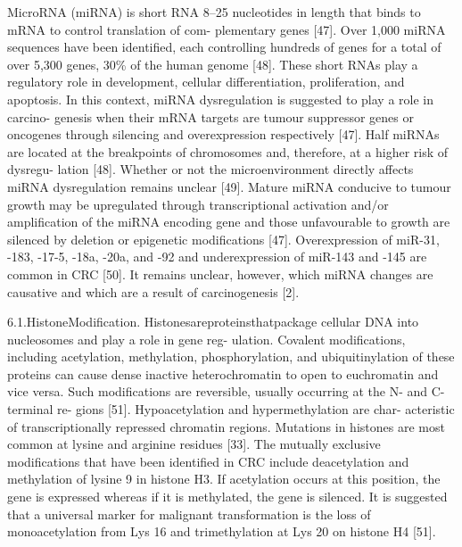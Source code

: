   MicroRNA (miRNA) is short RNA 8–25 nucleotides in length that binds to mRNA to
    control translation of com- plementary genes [47]. Over 1,000 miRNA sequences
    have been identified, each controlling hundreds of genes for a total of over
    5,300 genes, 30\% of the human genome [48]. These short RNAs play a regulatory
    role in development, cellular differentiation, proliferation, and apoptosis. In
    this context, miRNA dysregulation is suggested to play a role in carcino-
    genesis when their mRNA targets are tumour suppressor genes or oncogenes through
    silencing and overexpression respectively [47]. Half miRNAs are located at the
    breakpoints of chromosomes and, therefore, at a higher risk of dysregu- lation
    [48]. Whether or not the microenvironment directly affects miRNA dysregulation
    remains unclear [49]. Mature miRNA conducive to tumour growth may be upregulated
    through transcriptional activation and/or amplification of the miRNA encoding
    gene and those unfavourable to growth are silenced by deletion or epigenetic
    modifications [47]. Overexpression of miR-31, -183, -17-5, -18a, -20a, and -92
    and underexpression of miR-143 and -145 are common in CRC [50]. It remains
    unclear, however, which miRNA changes are causative and which are a result of
    carcinogenesis [2].

  6.1.HistoneModification. Histonesareproteinsthatpackage cellular DNA into
    nucleosomes and play a role in gene reg- ulation. Covalent modifications,
    including acetylation, methylation, phosphorylation, and ubiquitinylation of
    these proteins can cause dense inactive heterochromatin to open to euchromatin
    and vice versa. Such modifications are reversible, usually occurring at the N-
    and C-terminal re- gions [51]. Hypoacetylation and hypermethylation are char-
    acteristic of transcriptionally repressed chromatin regions. Mutations in
    histones are most common at lysine and arginine residues [33]. The mutually
    exclusive modifications that have been identified in CRC include deacetylation
    and methylation of lysine 9 in histone H3. If acetylation occurs at this
    position, the gene is expressed whereas if it is methylated, the gene is
    silenced. It is suggested that a universal marker for malignant transformation
    is the loss of monoacetylation from Lys 16 and trimethylation at Lys 20 on
    histone H4 [51].

